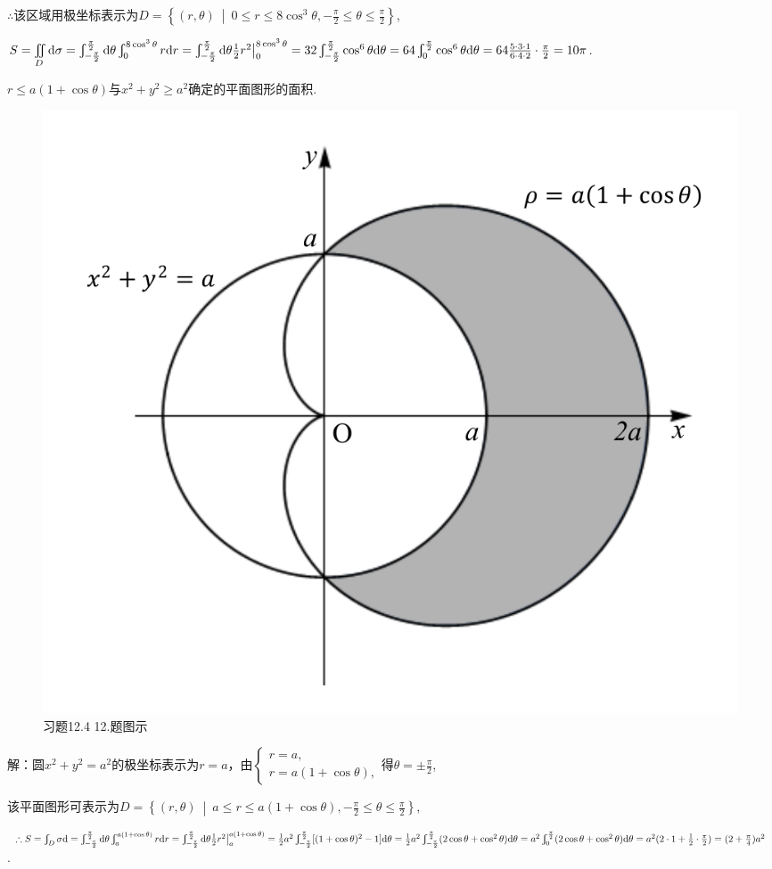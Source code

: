 \documentclass[12pt,UTF8]{ctexart}
\newcommand\Set[2]{\left\{#1\ \middle\vert\ #2 \right\}}
\newcommand{\Int}[4]{\varint\nolimits_{#1}^{#2}#3\mathrm d#4}
\newcommand{\IInt}[3]{\iint\limits_{#1}#2\mathrm d#3}
\begin{document}
\begin{enumerate}
$\therefore$该区域用极坐标表示为$D=\Set{(r,\theta)}{0\leqslant r\leqslant8\cos^3\theta,-\frac\pi2\leqslant\theta\leqslant\frac\pi2}$,

$S=\IInt D{}\sigma=\Int{-\frac\pi2}{\frac\pi2}{}\theta\Int0{8\cos^3\theta}rr=\Int{-\frac\pi2}{\frac\pi2}{}\theta\frac12r^2\big|_0^{8\cos^3\theta}=32\Int{-\frac\pi2}{\frac\pi2}{\cos^6\theta}\theta=64\Int0{\frac\pi2}{\cos^6\theta}\theta\\
=64\frac{5\cdot3\cdot1}{6\cdot4\cdot2}\cdot\frac\pi2=10\pi$.

$r\leqslant a(1+\cos\theta)$与$x^2+y^2\geqslant a^2$确定的平面图形的面积.

\begin{figure}[H]
\begin{center}
\includegraphics[height=0.4\textheight]{Figures19/Fig12-4-12.pdf}
\end{center}
\caption{习题12.4 12.题图示}
\label{12-4-12}
\end{figure}

解：圆$x^2+y^2=a^2$的极坐标表示为$r=a$，由$\begin{cases}
r=a,\\
r=a(1+\cos\theta),
\end{cases}$得$\theta=\pm\frac\pi2$,

该平面图形可表示为$D=\Set{(r,\theta)}{a\leqslant r\leqslant a(1+\cos\theta),-\frac\pi2\leqslant\theta\leqslant\frac\pi2}$,

$\therefore S=\Int D{}\sigma=\Int{-\frac\pi2}{\frac\pi2}{}\theta\Int a{a(1+\cos\theta)}rr=\Int{-\frac\pi2}{\frac\pi2}{}\theta\frac12r^2\big|_a^{a(1+\cos\theta)}=\frac12a^2\Int{-\frac\pi2}{\frac\pi2}{[(1+\cos\theta)^2-1]}\theta\\
=\frac12a^2\Int{-\frac\pi2}{\frac\pi2}{(2\cos\theta+\cos^2\theta)}\theta=a^2\Int0{\frac\pi2}{(2\cos\theta+\cos^2\theta)}\theta=a^2(2\cdot1+\frac12\cdot\frac\pi2)=(2+\frac\pi4)a^2$.


\end{enumerate}
\end{document}
